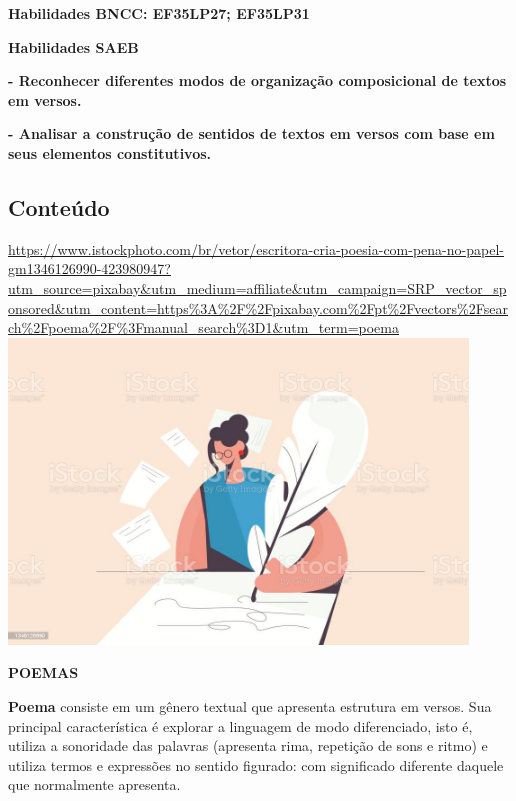 \textbf{Habilidades BNCC: EF35LP27; EF35LP31}

\textbf{Habilidades SAEB}

\textbf{- Reconhecer diferentes modos de organização composicional de
textos em versos.}

\textbf{- Analisar a construção de sentidos de textos em versos com base
em seus elementos constitutivos.}

\subsection{Conteúdo}\label{conteuxfado-4}

\href{https://www.istockphoto.com/br/vetor/escritora-cria-poesia-com-pena-no-papel-gm1346126990-423980947?utm_source=pixabay\&utm_medium=affiliate\&utm_campaign=SRP_vector_sponsored\&utm_content=https\%3A\%2F\%2Fpixabay.com\%2Fpt\%2Fvectors\%2Fsearch\%2Fpoema\%2F\%3Fmanual_search\%3D1\&utm_term=poema}{https://www.istockphoto.com/br/vetor/escritora-cria-poesia-com-pena-no-papel-gm1346126990-423980947?utm\_source=pixabay\&utm\_medium=affiliate\&utm\_campaign=SRP\_vector\_sponsored\&utm\_content=https\%3A\%2F\%2Fpixabay.com\%2Fpt\%2Fvectors\%2Fsearch\%2Fpoema\%2F\%3Fmanual\_search\%3D1\&utm\_term=poema\includegraphics[width=4.80139in,height=3.19792in]{media/image15.jpeg}}

\textbf{POEMAS}

\textbf{Poema} consiste em um gênero textual que apresenta estrutura em
versos. Sua principal característica é explorar a linguagem de modo
diferenciado, isto é, utiliza a sonoridade das palavras (apresenta rima,
repetição de sons e ritmo) e utiliza termos e expressões no sentido
figurado: com significado diferente daquele que normalmente apresenta.

